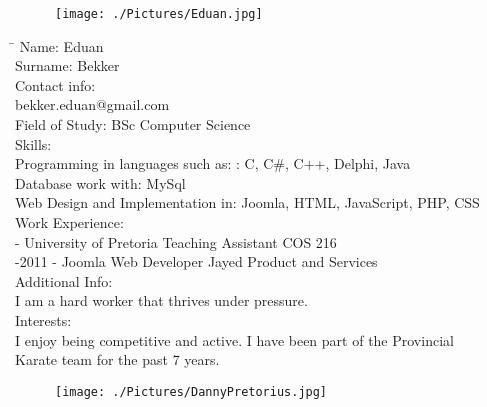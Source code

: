 \documentclass[12pt]{article}
\begin{document}
	\newpage 
	\begin{figure}[ht!]
		\centering
		\texttt{[image: ./Pictures/Eduan.jpg]}
	\end{figure}
	
	\begin{tabbing}
		\hspace*{3.5cm}\=\hspace*{3cm} \kill	
		Name: \> Eduan \\
		Surname: \> Bekker \\
		Contact info:  \\
			\> bekker.eduan@gmail.com \\
		Field of Study: \> BSc Computer Science \\
		Skills:  \\
			\> Programming in languages such as: : C, C\#, C++, Delphi, Java \\
			\> Database work with: MySql \\
			\> Web Design and Implementation in: Joomla, HTML, JavaScript, PHP, CSS  \\
		Work Experience: \\
			 - University of Pretoria Teaching Assistant COS 216 \\
			-2011 - Joomla Web Developer Jayed Product and Services \\
		Additional Info:  \\
			\> I am a hard worker that thrives under pressure. \\
		Interests: \\
			\> I enjoy being competitive and active. I have been part of the Provincial \\ \> Karate team for the past 7 years. \\
	\end{tabbing}

	\newpage %
	\begin{figure}[htbp]
		\centering
		\texttt{[image: ./Pictures/DannyPretorius.jpg]}
	\end{figure}
\end{document}
